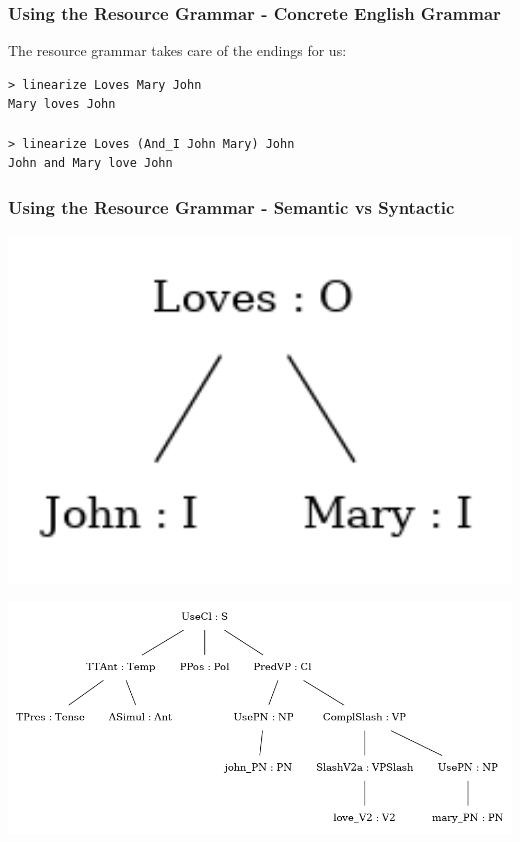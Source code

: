 \documentclass{beamer}
\begin{document}
\begin{frame}[fragile]
    \frametitle{Using the Resource Grammar - Concrete English Grammar}

    

    \vspace{1em}
    The resource grammar takes care of the endings for us:
\begin{lstlisting}[language=GFcmd, breaklines=true]
> linearize Loves Mary John
Mary loves John

> linearize Loves (And_I John Mary) John
John and Mary love John
\end{lstlisting}
\end{frame}

\begin{frame}[fragile]
    \frametitle{Using the Resource Grammar - Semantic vs Syntactic}
    \begin{minipage}{0.31\textwidth}
        \includegraphics[width=1.1\textwidth]{jlm_sem.png}
    \end{minipage}
    \begin{minipage}{0.64\textwidth}
        \includegraphics[width=1.1\textwidth]{jlm_syn.png}
    \end{minipage}


\end{frame}
\end{document}
